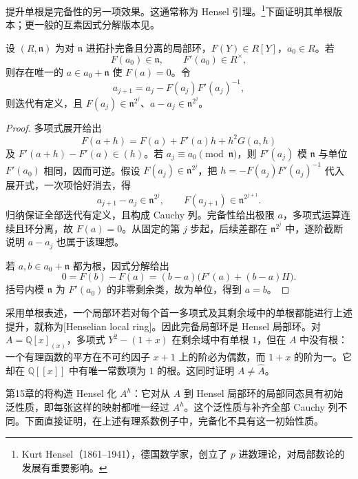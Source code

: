 \ProseParagraphBreak

提升单根是完备性的另一项效果。这通常称为 Hensel 引理。\footnote{Kurt Hensel（1861--1941），德国数学家，创立了 \(p\) 进数理论，对局部数论的发展有重要影响。}下面证明其单根版本；更一般的互素因式分解版本见\cite[第8节，定理8.3，第58页]{Matsumura1989}。

\begin{theorem}\label{g5:thm:complete-simple-root}
	设 \((R,\mathfrak n)\) 为对 \(\mathfrak n\) 进拓扑完备且分离的局部环，\(F(Y)\in R[Y]\)，\(a_0\in R\)。若
	\[
		F(a_0)\in\mathfrak n,\qquad F'(a_0)\in R^\times,
	\]
	则存在唯一的 \(a\in a_0+\mathfrak n\) 使 \(F(a)=0\)。令
	\[
		a_{j+1}=a_j-F(a_j)F'(a_j)^{-1},
	\]
	则迭代有定义，且
	\(F(a_j)\in\mathfrak n^{2^j}\)、\(a-a_j\in\mathfrak n^{2^j}\)。
\end{theorem}
\begin{proof}
	多项式展开给出
	\[
		F(a+h)=F(a)+F'(a)h+h^2G(a,h)
	\]
	及 \(F'(a+h)-F'(a)\in(h)\)。若 \(a_j\equiv a_0\pmod{\mathfrak n}\)，则 \(F'(a_j)\) 模 \(\mathfrak n\) 与单位 \(F'(a_0)\) 相同，因而可逆。假设
	\(F(a_j)\in\mathfrak n^{2^j}\)，把
	\(h=-F(a_j)F'(a_j)^{-1}\) 代入展开式，一次项恰好消去，得
	\[
		a_{j+1}-a_j\in\mathfrak n^{2^j},\qquad
		F(a_{j+1})\in\mathfrak n^{2^{j+1}}.
	\]
	归纳保证全部迭代有定义，且构成 Cauchy 列。完备性给出极限 \(a\)，多项式运算连续且环分离，故 \(F(a)=0\)。从固定的第 \(j\) 步起，后续差都在 \(\mathfrak n^{2^j}\) 中，逐阶截断说明 \(a-a_j\) 也属于该理想。

	若 \(a,b\in a_0+\mathfrak n\) 都为根，因式分解给出
	\[
		0=F(b)-F(a)=(b-a)\bigl(F'(a)+(b-a)H\bigr).
	\]
	括号内模 \(\mathfrak n\) 为 \(F'(a_0)\) 的非零剩余类，故为单位，得到 \(a=b\)。
\end{proof}

采用单根表述，一个局部环若对每个首一多项式及其剩余域中的单根都能进行上述提升，就称为[Henselian local ring]。因此完备局部环是 Hensel 局部环。对 \(A=\mathbb Q[x]_{(x)}\)，多项式 \(Y^2-(1+x)\) 在剩余域中有单根 \(1\)，但在 \(A\) 中没有根：一个有理函数的平方在不可约因子 \(x+1\) 上的阶必为偶数，而 \(1+x\) 的阶为一。它却在 \(\mathbb Q[[x]]\) 中有唯一常数项为 \(1\) 的根。这同时证明 \(A\ne\widehat A\)。

\ProseParagraphBreak

第15章的将构造 Hensel 化 \(A^h\)：它对从 \(A\) 到 Hensel 局部环的局部同态具有初始泛性质，即每张这样的映射都唯一经过 \(A^h\)。这个泛性质与补齐全部 Cauchy 列不同。下面直接证明，在上述有理系数例子中，完备化不具有这一初始性质。

